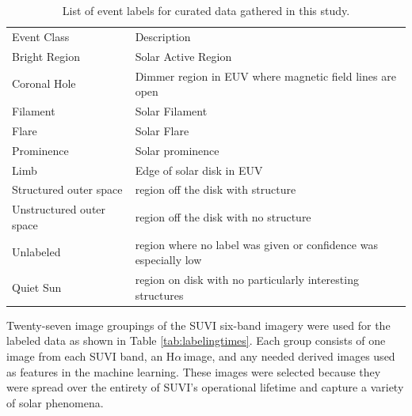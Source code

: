 \documentclass[twoside]{report}
\newcommand{\halpha}{H$\alpha$\,}
\begin{document}
\begin{table}[ht!]
  \centering
  \begin{tabular}{||p{4cm} p{10cm}||}
    \hline
    Event Class & Description \\
    Bright Region & Solar Active Region\\
    Coronal Hole & Dimmer region in EUV where magnetic field lines are open\\
    Filament & Solar Filament \\
    Flare & Solar Flare \\
    Prominence & Solar prominence \\
    Limb & Edge of solar disk in EUV \\
    Structured outer space & region off the disk with structure \\
    Unstructured outer space & region off the disk with no structure \\
    Unlabeled & region where no label was given or confidence was especially low \\
    Quiet Sun & region on disk with no particularly interesting structures \\
    \hline             
  \end{tabular}
  \caption{List of event labels for curated data gathered in this study.}
  \label{tab:mylabels}
\end{table}

Twenty-seven image groupings of the SUVI six-band imagery were used for the labeled data as shown in Table \ref{tab:labelingtimes}. Each group consists of one image from each SUVI band, an \halpha image, and any needed derived images used as features in the machine learning. These images were selected because they were spread over the entirety of SUVI's operational lifetime and capture a variety of solar phenomena. 
\end{document}
